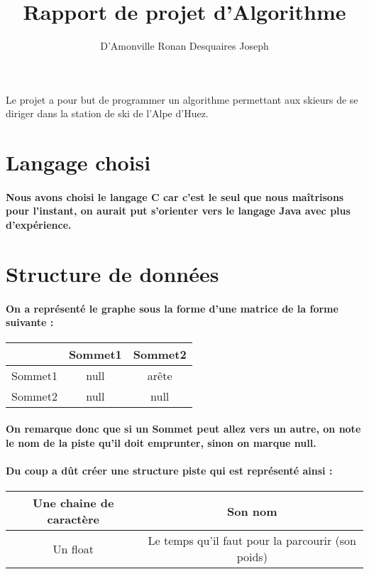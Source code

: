 \documentclass [a4] {article}
\author {D'Amonville Ronan Desquaires Joseph}
\title {Rapport de projet d'Algorithme}
\begin{document}
\maketitle

\textsf Le projet a pour but de programmer un algorithme permettant aux skieurs de se diriger dans la station de ski de l'Alpe d'Huez.\\

\newpage
\section {Langage choisi}

\paragraph { Nous avons choisi le langage C car c'est le seul que nous maîtrisons pour l'instant, on aurait put s'orienter vers le langage Java avec plus d'expérience.} 

\section{Structure de données}

\paragraph {On a représenté le graphe sous la forme d'une matrice de la forme suivante :}
\begin{tabular}{|c|c|c|}
\hline  \cellcolor{black} & Sommet1 & Sommet2 \\
\hline Sommet1 & null & arête \\
\hline Sommet2 & null & null \\
\hline 
\end{tabular}
\paragraph{On remarque donc que si un Sommet peut allez vers un autre, on note le nom de la piste qu'il doit emprunter, sinon on marque null.}
\paragraph{Du coup a dût créer une structure piste qui est représenté ainsi :}
\begin{tabular}{|c|c|}
\hline  Une chaine de caractère & Son nom \\
\hline Un float & Le temps qu'il faut pour la parcourir (son poids) \\
\hline
\end{tabular}
\end{document}
